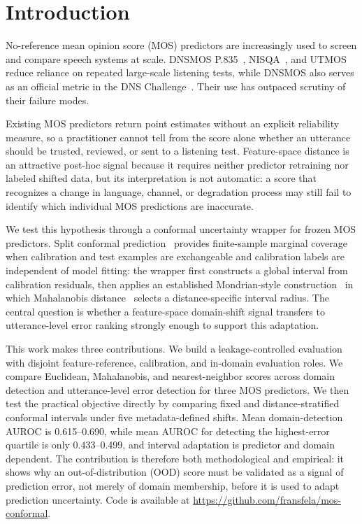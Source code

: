 
\section{Introduction}
\label{sec:intro}

No-reference mean opinion score (MOS) predictors are increasingly used to screen and compare speech systems at scale. DNSMOS P.835~\cite{Reddy2022dnsmos}, NISQA~\cite{Mittag2021nisqa}, and UTMOS~\cite{Saeki2022utmos} reduce reliance on repeated large-scale listening tests, while DNSMOS also serves as an official metric in the DNS Challenge~\cite{Dubey2024icassp,Reddy2019scalable}. Their use has outpaced scrutiny of their failure modes.

Existing MOS predictors return point estimates without an explicit reliability measure, so a practitioner cannot tell from the score alone whether an utterance should be trusted, reviewed, or sent to a listening test. Feature-space distance is an attractive post-hoc signal because it requires neither predictor retraining nor labeled shifted data, but its interpretation is not automatic: a score that recognizes a change in language, channel, or degradation process may still fail to identify which individual MOS predictions are inaccurate.

We test this hypothesis through a conformal uncertainty wrapper for frozen MOS predictors. Split conformal prediction~\cite{Angelopoulos2023conformal} provides finite-sample marginal coverage when calibration and test examples are exchangeable and calibration labels are independent of model fitting: the wrapper first constructs a global interval from calibration residuals, then applies an established Mondrian-style construction~\cite{Bostrom2020Mondrian} in which Mahalanobis distance~\cite{Lee2018} selects a distance-specific interval radius. The central question is whether a feature-space domain-shift signal transfers to utterance-level error ranking strongly enough to support this adaptation.

This work makes three contributions. We build a leakage-controlled evaluation with disjoint feature-reference, calibration, and in-domain evaluation roles. We compare Euclidean, Mahalanobis, and nearest-neighbor scores across domain detection and utterance-level error detection for three MOS predictors. We then test the practical objective directly by comparing fixed and distance-stratified conformal intervals under five metadata-defined shifts. Mean domain-detection AUROC is 0.615--0.690, while mean AUROC for detecting the highest-error quartile is only 0.433--0.499, and interval adaptation is predictor and domain dependent. The contribution is therefore both methodological and empirical: it shows why an out-of-distribution (OOD) score must be validated as a signal of prediction error, not merely of domain membership, before it is used to adapt prediction uncertainty. Code is available at \url{https://github.com/fransfela/mos-conformal}.
